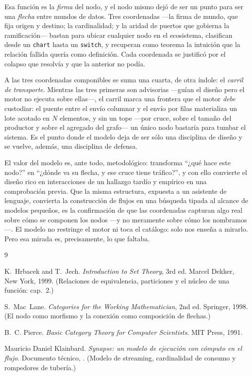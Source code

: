 \documentclass[11pt,a4paper]{article}
\theoremstyle{definition}
\theoremstyle{plain}
\begin{document}
Esa función es la \emph{firma} del nodo, y el nodo mismo dejó de ser un punto para
ser una \emph{flecha} entre mundos de datos. Tres coordenadas ---la firma de mundo,
que fija origen y destino; la cardinalidad; y la aridad de puertos que gobierna la
ramificación--- bastan para ubicar cualquier nodo en el ecosistema, clasifican desde
un \texttt{chart} hasta un \texttt{switch}, y recuperan como teorema la intuición
que la relación fallida quería como definición. Cada coordenada se justificó por el
colapso que resolvía y que la anterior no podía.

A las tres coordenadas componibles se suma una cuarta, de otra índole: el
\emph{carril de transporte}. Mientras las tres primeras son advisorias ---guían el
diseño pero el motor no ejecuta sobre ellas---, el carril marca una frontera que el
motor \emph{debe} custodiar: el puente entre el envío columnar y el envío por filas
materializa un lote acotado en $N$ elementos, y sin un tope ---por cruce, sobre el
tamaño del productor y sobre el agregado del grafo--- un único nodo bastaría para
tumbar el sistema. Es el punto donde el modelo deja de ser sólo una disciplina de
diseño y se vuelve, además, una disciplina de defensa.

El valor del modelo es, ante todo, metodológico: transforma ``¿qué hace este nodo?''
en ``¿dónde va su flecha, y ese cruce tiene tráfico?'', y con ello convierte el
diseño rico en interacciones de un hallazgo tardío y empírico en una comprobación
previa. Que la misma estructura, expuesta a un asistente de lenguaje, convierta la
construcción de flujos en una búsqueda tipada al alcance de modelos pequeños, es la
confirmación de que las coordenadas capturan algo real sobre cómo se componen los
nodos ---y no meramente sobre cómo los nombramos---. El modelo no restringe el motor
ni toca el catálogo: solo nos enseña a mirarlo. Pero esa mirada es, precisamente, lo
que faltaba.

\begin{thebibliography}{9}

K.~Hrbacek and T.~Jech.
\newblock \emph{Introduction to Set Theory}, 3rd ed.
\newblock Marcel Dekker, New York, 1999.
\newblock (Relaciones de equivalencia, particiones y el núcleo de una función:
cap.~2.)

S.~Mac~Lane.
\newblock \emph{Categories for the Working Mathematician}, 2nd ed.
\newblock Springer, 1998.
\newblock (El nodo como morfismo y la conexión como composición de flechas.)

B.~C. Pierce.
\newblock \emph{Basic Category Theory for Computer Scientists}.
\newblock MIT Press, 1991.

Mauricio Daniel Klainbard.
\newblock \emph{Synapse: un modelo de ejecución con cómputo en el flujo}.
\newblock Documento técnico, \the\year{}.
\newblock (Modelo de streaming, cardinalidad de consumo y rompedores de tubería.)

\end{thebibliography}
\end{document}
